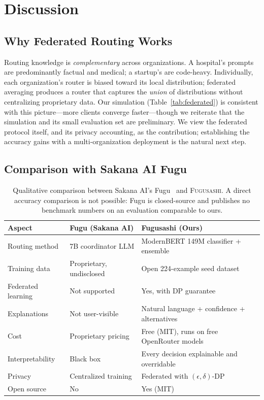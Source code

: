 \documentclass[11pt,a4paper]{article}
\newcommand{\fugusashi}{\textsc{Fugusashi}}
\begin{document}
\section{Discussion}

\subsection{Why Federated Routing Works}

Routing knowledge is \textit{complementary} across organizations.
A hospital's prompts are predominantly factual and medical; a startup's are code-heavy.
Individually, each organization's router is biased toward its local distribution; federated averaging produces a router that captures the \textit{union} of distributions without centralizing proprietary data.
Our simulation (Table~\ref{tab:federated}) is consistent with this picture---more clients converge faster---though we reiterate that the simulation and its small evaluation set are preliminary.
We view the federated protocol itself, and its privacy accounting, as the contribution; establishing the accuracy gains with a multi-organization deployment is the natural next step.

\subsection{Comparison with Sakana AI Fugu}

\begin{table}[t]
\centering
\small
\begin{tabular}{lp{4.5cm}p{4.5cm}}
\toprule
\textbf{Aspect} & \textbf{Fugu (Sakana AI)} & \textbf{Fugusashi (Ours)} \\
\midrule
Routing method & 7B coordinator LLM & ModernBERT 149M classifier + ensemble \\
Training data & Proprietary, undisclosed & Open 224-example seed dataset \\
Federated learning & Not supported & Yes, with DP guarantee \\
Explanations & Not user-visible & Natural language + confidence + alternatives \\
Cost & Proprietary pricing & Free (MIT), runs on free OpenRouter models \\
Interpretability & Black box & Every decision explainable and overridable \\
Privacy & Centralized training & Federated with $(\epsilon,\delta)$-DP \\
Open source & No & Yes (MIT) \\
\bottomrule
\end{tabular}
\caption{Qualitative comparison between Sakana AI's Fugu~\cite{fugu2026} and \fugusashi{}. A direct accuracy comparison is not possible: Fugu is closed-source and publishes no benchmark numbers on an evaluation comparable to ours.}
\label{tab:comparison}
\end{table}
\end{document}
